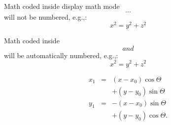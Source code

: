 Math coded inside display math mode \[ ...\]
 will not be numbered, e.g.,:
 \[ x^2=y^2 + z^2\]

 Math coded inside \begin{equation} and \end{equation} will
 be automatically numbered, e.g.,:
 \begin{equation}
 x^2=y^2 + z^2
 \end{equation}


\begin{eqnarray}
  x_{1} & = & (x - x_{0}) \cos \Theta \nonumber \\
        && + (y - y_{0}) \sin \Theta  \nonumber \\
  y_{1} & = & -(x - x_{0}) \sin \Theta \nonumber \\
        && + (y - y_{0}) \cos \Theta.
\end{eqnarray}






%
%


%

